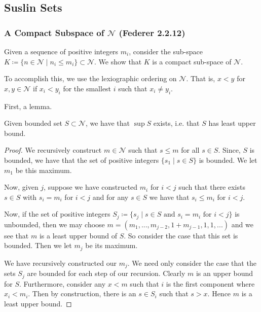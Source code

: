 \subsection{Suslin Sets}

\subsubsection{A Compact Subspace of \(\mathcal N\) (Federer 2.2.12)}

Given a sequence of positive integers \(m_i\), consider the sub-space
\(K \coloneqq \{n \in \mathcal N \mid n_i \leq m_i\} \subset \mathcal N\). We show that \(K\) is a compact
sub-space of \(\mathcal N\).

To accomplish this, we use the lexiographic ordering on \(\mathcal N\). That is, \(x < y\) for
\(x, y \in \mathcal N\) if \(x_i < y_i\) for the smallest \(i\) such that \(x_i \neq y_i\).

First, a lemma. 
\begin{lemma}
Given bounded set \(S \subset \mathcal N\), we have that \(\sup S\) exists, i.e. that \(S\) has least
upper bound.
\end{lemma}
\begin{proof}
We recursively construct \(m \in \mathcal N\) such that \(s \leq m\) for all \(s \in S\). Since, \(S\) is
bounded, we have that the set of positive integers \(\{s_1 \mid s \in S\}\) is bounded. We let \(m_1\) be this
maximum. 

Now, given \(j\), suppose we have constructed \(m_i\) for \(i < j\) such that there exists \(s \in S\) with
\(s_i = m_i\) for \(i < j\) and for any \(s \in S\) we have that \(s_i \leq m_i\) for \(i < j\). 

Now, if the set of positive integers
\(S_j \coloneqq \{s_j \mid s \in S \text{ and } s_i = m_i \text{ for } i < j\}\) is unbounded, then we may choose 
\(m = (m_1,..., m_{j-2}, 1 + m_{j-1}, 1, 1, ...)\) and we see that \(m\) is a least upper bound of \(S\).
So consider the case that this set is bounded. Then we let \(m_j\) be its maximum.

We have recursively constructed our \(m_j\). We need only consider the case that the sets \(S_j\) are bounded
for each step of our recursion. Clearly \(m\) is an upper bound for \(S\). Furthermore, consider any \(x < m\)
such that \(i\) is the first component where \(x_i < m_i\). Then by construction, there is an \(s \in S_i\) such
that \(s > x\). Hence \(m\) is a least upper bound. 

\end{proof}
